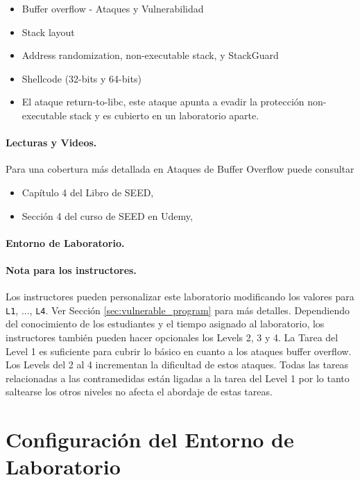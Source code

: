 \begin{itemize}[noitemsep]
\item Buffer overflow - Ataques y Vulnerabilidad
\item Stack layout 
\item Address randomization, non-executable stack, y StackGuard
\item Shellcode (32-bits y 64-bits)
\item El ataque return-to-libc, este ataque apunta a evadir la protección non-executable stack y es cubierto en un laboratorio aparte.
\end{itemize}


\paragraph{Lecturas y Videos.}
Para una cobertura más detallada en Ataques de Buffer Overflow puede consultar

\begin{itemize}
\item Capítulo 4 del Libro de SEED, \seedbook
\item Sección 4 del curso de SEED en Udemy, \seedcsvideo
\end{itemize}


\paragraph{Entorno de Laboratorio.} 
\seedenvironmentC


\paragraph{Nota para los instructores.}
Los instructores pueden personalizar este laboratorio modificando los valores para \texttt{L1}, ..., \texttt{L4}. Ver Sección \ref{sec:vulnerable_program} para más detalles.
Dependiendo del conocimiento de los estudiantes y el tiempo asignado al laboratorio, los instructores también pueden hacer opcionales los Levels 2, 3 y 4.
La Tarea del Level 1 es suficiente para cubrir lo básico en cuanto a los ataques buffer overflow. Los Levels del 2 al 4 incrementan la dificultad de estos ataques.
Todas las tareas relacionadas a las contramedidas están ligadas a la tarea del Level 1 por lo tanto saltearse los otros niveles no afecta el abordaje de estas tareas.


\section{Configuración del Entorno de Laboratorio}

